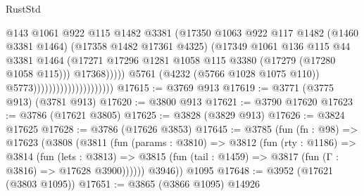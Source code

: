 \begin{lexlean}{RustStd}
\begin{coremodule}
                                                    @143
                                                    @1061
                                                    @922
                                                    @115
                                                    @1482
                                                    @3381
                                                    (@17350
                                                      @1063
                                                      @922
                                                      @117
                                                      @1482
                                                      (@1460 @3381 @1464)
                                                      (@17358 @1482 @17361 @4325)
                                                      (@17349
                                                        @1061
                                                        @136
                                                        @115
                                                        @44
                                                        @3381
                                                        @1464
                                                        (@17271
                                                          @17296
                                                          @1281
                                                          @1058
                                                          @115
                                                          @3380
                                                          (@17279 (@17280 @1058 @115)))
                                                        @17368)))))
                                              @5761
                                              (@4232 (@5766 @1028 @1075 @110))
                                              @5773)))))))))))))))))))))
@17615 := @3769 @913
@17619 := @3771 (@3775 @913) (@3781 @913)
@17620 := @3800 @913
@17621 := @3790 @17620
@17623 := @3786 (@17621 @3805)
@17625 := @3828 (@3829 @913)
@17626 := @3824 @17625
@17628 := @3786 (@17626 @3853)
@17645 := @3785
    (fun (fn : @98) =>
    @17623
      (@3808
        (@3811
          (fun (params : @3810) =>
          @3812
            (fun (rty : @1186) =>
            @3814
              (fun (lets : @3813) =>
              @3815 (fun (tail : @1459) => @3817 (fun (Γ : @3816) => @17628 @3900))))))
        @3946))
    @1095
@17648 := @3952 (@17621 (@3803 @1095))
@17651 := @3865 (@3866 @1095) @14926

\end{coremodule}
\end{lexlean}
